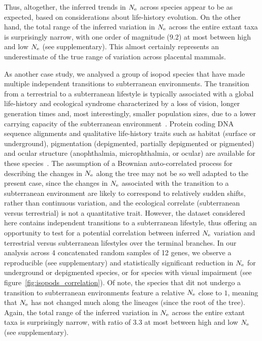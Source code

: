 Thus, altogether, the inferred trends in $N_{\text{e}}$ across species appear to be as expected, based on considerations about life-history evolution.
On the other hand, the total range of the inferred variation in $N_{\text{e}}$ across the entire extant taxa is surprisingly narrow, with one order of magnitude ($9.2$) at most between high and low $N_{\text{e}}$ (see supplementary).
This almost certainly represents an underestimate of the true range of variation across placental mammals.

As another case study, we analysed a group of isopod species that have made multiple independent transitions to subterranean environments.
The transition from a terrestrial to a subterranean lifestyle is typically associated with a global life-history and ecological syndrome characterized by a loss of vision, longer generation times and, most interestingly, smaller population sizes, due to a lower carrying capacity of the subterranean environment~\citep{Capderrey2013}.
Protein coding {DNA} sequence alignments and qualitative life-history traits such as habitat (surface or underground), pigmentation (depigmented, partially depigmented or pigmented) and ocular structure (anophthalmia, microphthalmia, or ocular) are available for these species~\citep{Eme2013,Saclier2018}.
The assumption of a Brownian auto-correlated process for describing the changes in $N_{\text{e}}$ along the tree may not be so well adapted to the present case, since the changes in $N_{\text{e}}$ associated with the transition to a subterranean environment are likely to correspond to relatively sudden shifts, rather than continuous variation, and the ecological correlate (subterranean versus terrestrial) is not a quantitative trait.
However, the dataset considered here contains independent transitions to a subterranean lifestyle, thus offering an opportunity to test for a potential correlation between inferred $N_{\text{e}}$ variation and terrestrial versus subterranean lifestyles over the terminal branches.
In our analysis across 4 concatenated random samples of 12 genes, we observe a reproducible (see supplementary) and statistically significant reduction in $N_{\text{e}}$ for underground or depigmented species, or for species with visual impairment (see figure~\ref{fig:isopods_correlation}).
Of note, the species that dit not undergo a transition to subterranean environments feature a relative $N_{\text{e}}$ close to $1$, meaning that $N_{\text{e}}$ has not changed much along the lineages (since the root of the tree).
Again, the total range of the inferred variation in $N_{\text{e}}$ across the entire extant taxa is surprisingly narrow, with ratio of $3.3$ at most between high and low $N_{\text{e}}$ (see supplementary).

